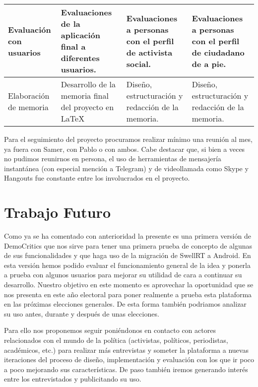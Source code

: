 \begin{table}[!]
\begin{sideways}
\begin{tabular}{|m{3cm}|m{5.5cm}|m{5cm}|m{5cm}|}
Evaluación con usuarios           & Evaluaciones de la aplicación final a diferentes usuarios.                                                                               & Evaluaciones a personas con el perfil de activista social.                                                                         & Evaluaciones a personas con el perfil de ciudadano de a pie.                                                 \\ \hline
Elaboración de memoria            & Desarrollo de la memoria final del proyecto en \LaTeX\.                                                                                & Diseño, estructuración y redacción de la memoria.                                                                                  & Diseño, estructuración y redacción de la memoria.                                                            \\ \hline
\end{tabular}
\end{sideways}
\end{table}

Para el seguimiento del proyecto procuramos realizar mínimo una reunión al mes, ya fuera con Samer, con Pablo o con ambos. Cabe destacar que, si bien a veces no pudimos reunirnos en persona, el uso de herramientas de mensajería instantánea (con especial mención a Telegram) y de videollamada como Skype y Hangouts fue constante entre los involucrados en el proyecto.

\section{Trabajo Futuro}

Como ya se ha comentado con anterioridad la presente es una primera versión de DemoCritics que nos sirve para tener una primera prueba de concepto de algunas de sus funcionalidades y que haga uso de la migración de SwellRT a Android. En esta versión hemos podido evaluar el funcionamiento general de la idea y ponerla a prueba con algunos usuarios para mejorar su utilidad de cara a continuar su desarrollo. Nuestro objetivo en este momento es aprovechar la oportunidad que se nos presenta en este año electoral para poner realmente a prueba esta plataforma en las próximas elecciones generales. De esta forma también podriamos analizar su uso antes, durante y después de unas elecciones.

Para ello nos proponemos seguir poniéndonos en contacto con actores relacionados con el mundo de la política (activistas, políticos, periodistas, académicos, etc.) para realizar más entrevistas y someter la plataforma a nuevas iteraciones del proceso de diseño, implementación y evaluación con los que ir poco a poco mejorando sus características. De paso también iremos generando interés entre los entrevistados y publicitando su uso.

